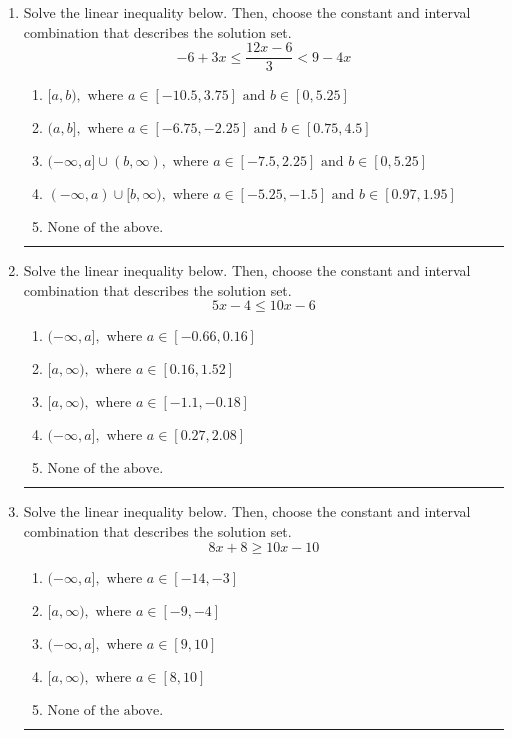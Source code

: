 \documentclass[14pt]{extbook}
\newcommand{\litem}[1]{\item#1\hspace*{-1cm}\rule{\textwidth}{0.4pt}}
\begin{document}
\begin{enumerate}
{\begin{enumerate}[label=\Alph*.]
\end{enumerate} }
\litem{
Solve the linear inequality below. Then, choose the constant and interval combination that describes the solution set.\[ -6 + 3 x \leq \frac{12 x - 6}{3} < 9 - 4 x \]\begin{enumerate}[label=\Alph*.]
\item \( [a, b), \text{ where } a \in [-10.5, 3.75] \text{ and } b \in [0, 5.25] \)
\item \( (a, b], \text{ where } a \in [-6.75, -2.25] \text{ and } b \in [0.75, 4.5] \)
\item \( (-\infty, a] \cup (b, \infty), \text{ where } a \in [-7.5, 2.25] \text{ and } b \in [0, 5.25] \)
\item \( (-\infty, a) \cup [b, \infty), \text{ where } a \in [-5.25, -1.5] \text{ and } b \in [0.97, 1.95] \)
\item \( \text{None of the above.} \)

\end{enumerate} }
\litem{
Solve the linear inequality below. Then, choose the constant and interval combination that describes the solution set.\[ 5x -4 \leq 10x -6 \]\begin{enumerate}[label=\Alph*.]
\item \( (-\infty, a], \text{ where } a \in [-0.66, 0.16] \)
\item \( [a, \infty), \text{ where } a \in [0.16, 1.52] \)
\item \( [a, \infty), \text{ where } a \in [-1.1, -0.18] \)
\item \( (-\infty, a], \text{ where } a \in [0.27, 2.08] \)
\item \( \text{None of the above}. \)

\end{enumerate} }
\litem{
Solve the linear inequality below. Then, choose the constant and interval combination that describes the solution set.\[ 8x + 8 \geq 10x -10 \]\begin{enumerate}[label=\Alph*.]
\item \( (-\infty, a], \text{ where } a \in [-14, -3] \)
\item \( [a, \infty), \text{ where } a \in [-9, -4] \)
\item \( (-\infty, a], \text{ where } a \in [9, 10] \)
\item \( [a, \infty), \text{ where } a \in [8, 10] \)
\item \( \text{None of the above}. \)


\end{enumerate}}
\end{enumerate}
\end{document}
